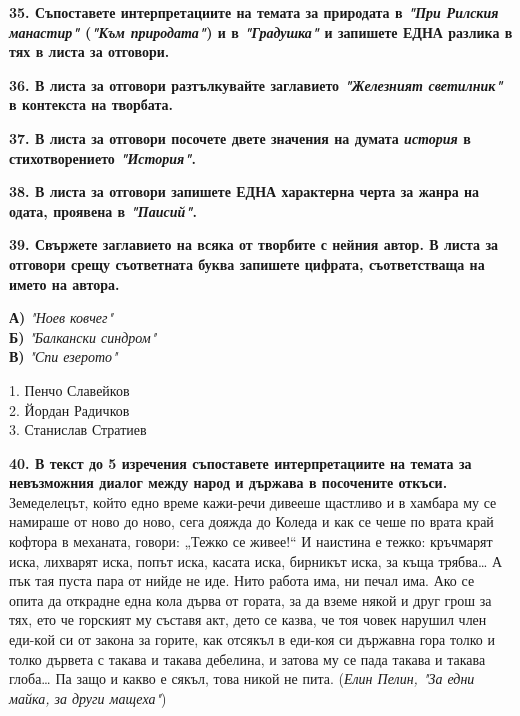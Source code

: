 \documentclass[12pt,a4paper]{article}
\begin{document}
\noindent
\textbf{35. Съпоставете интерпретациите на темата за природата в \textit{"При Рилския манастир"} (\textit{"Към природата"}) и в \textit{"Градушка"} и запишете ЕДНА разлика в тях в листа за отговори.}

\vspace{0.6cm}

\noindent
\textbf{36. В листа за отговори разтълкувайте заглавието \textit{"Железният светилник"} в контекста на творбата.}

\vspace{0.6cm}

\noindent
\textbf{37. В листа за отговори посочете двете значения на думата \textit{история} в стихотворението \textit{"История"}.}

\vspace{0.6cm}

\noindent
\textbf{38. В листа за отговори запишете ЕДНА характерна черта за жанра на одата, проявена в \textit{"Паисий"}.}

\vspace{0.6cm}

\noindent
\textbf{39. Свържете заглавието на всяка от творбите с нейния автор. В листа за отговори срещу съответната буква запишете цифрата, съответстваща на името на автора.} \\[0.8em]
\begin{minipage}[t]{0.45\textwidth}
    \textbf{А)} \textit{"Ноев ковчег"} \\
    \textbf{Б)} \textit{"Балкански синдром"} \\
    \textbf{В)} \textit{"Спи езерото"}
\end{minipage}
\begin{minipage}[t]{0.45\textwidth}
    1. Пенчо Славейков \\
    2. Йордан Радичков \\
    3. Станислав Стратиев
\end{minipage}

\vspace{0.6cm}

\vspace{0.8cm}

\noindent
\textbf{40. В текст до 5 изречения съпоставете интерпретациите на темата за невъзможния диалог между народ и държава в посочените откъси.} \\[0.5em]

 
\indent Земеделецът, който едно време кажи-речи дивееше щастливо и в хамбара му се намираше от ново до ново, сега дояжда до Коледа и как се чеше по врата край кофтора в механата, говори: „Тежко се живее!“ И наистина е тежко: кръчмарят иска, лихварят иска, попът иска, касата иска, бирникът иска, за къща трябва\dots{} А пък тая пуста пара от нийде не иде. Нито работа има, ни печал има. Ако се опита да открадне една кола дърва от гората, за да вземе някой и друг грош за тях, ето че горският му съставя акт, дето се казва, че тоя човек нарушил член еди-кой си от закона за горите, как отсякъл в еди-коя си държавна гора толко и толко дървета с такава и такава дебелина, и затова му се пада такава и такава глоба\dots{} Па защо и какво е сякъл, това никой не пита. (\textit{Елин Пелин, "За едни майка, за други мащеха"}) \\[0.4em]
 
\end{document}
